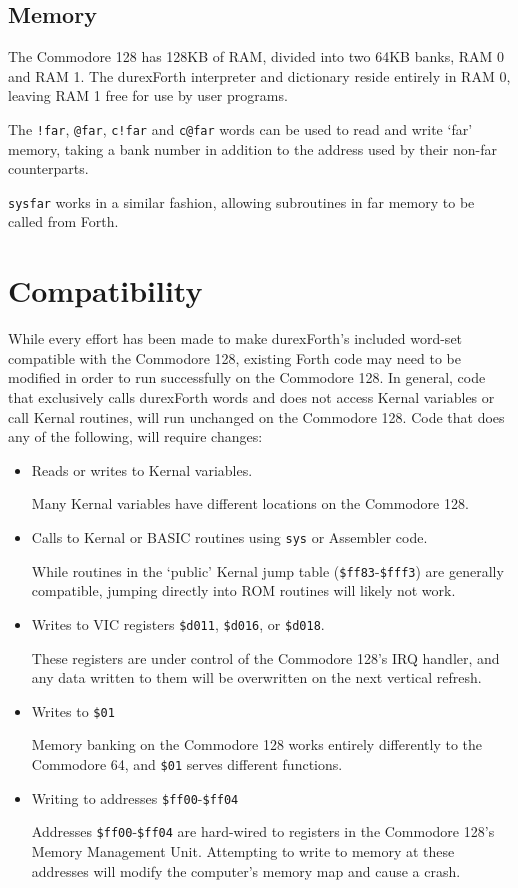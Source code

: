 \subsection{Memory}

The Commodore 128 has 128KB of RAM, divided into two 64KB banks, RAM 0 and RAM 1. The durexForth interpreter and dictionary reside entirely in RAM 0, leaving RAM 1 free for use by user programs.

The \texttt{!far}, \texttt{@far}, \texttt{c!far} and \texttt{c@far} words can be used to read and write `far' memory, taking a bank number in addition to the address used by their non-far counterparts.

\texttt{sysfar} works in a similar fashion, allowing subroutines in far memory to be called from Forth.

\section{Compatibility}

While every effort has been made to make durexForth's included word-set compatible with the Commodore 128, existing Forth code may need to be modified in order to run successfully on the Commodore 128. In general, code that exclusively calls durexForth words and does not access Kernal variables or call Kernal routines, will run unchanged on the Commodore 128. Code that does any of the following, will require changes:

\begin{itemize}
\item Reads or writes to Kernal variables.

Many Kernal variables have different locations on the Commodore 128.

\item Calls to Kernal or BASIC routines using \texttt{sys} or Assembler code.

While routines in the `public' Kernal jump table (\texttt{\$ff83}-\texttt{\$fff3}) are generally compatible, jumping directly into ROM routines will likely not work.

\item Writes to VIC registers \texttt{\$d011}, \texttt{\$d016}, or \texttt{\$d018}.

These registers are under control of the Commodore 128's IRQ handler, and any data written to them will be overwritten on the next vertical refresh.

\item Writes to \texttt{\$01}

Memory banking on the Commodore 128 works entirely differently to the Commodore 64, and \texttt{\$01} serves different functions.

\item Writing to addresses \texttt{\$ff00}-\texttt{\$ff04}

Addresses \texttt{\$ff00}-\texttt{\$ff04} are hard-wired to registers in the Commodore 128's Memory Management Unit. Attempting to write to memory at these addresses will modify the computer's memory map and cause a crash.

\end{itemize}

